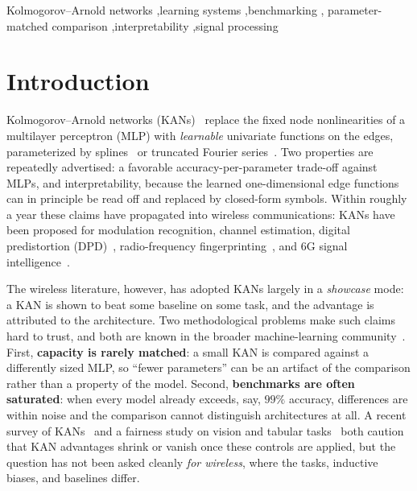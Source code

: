\documentclass[final,5p,times]{elsarticle}
\begin{document}
\begin{frontmatter}
\begin{keyword}
Kolmogorov--Arnold networks \sep learning systems \sep benchmarking \sep
parameter-matched comparison \sep interpretability \sep signal processing
\end{keyword}

\end{frontmatter}

\section{Introduction}\label{sec:intro}
Kolmogorov--Arnold networks (KANs)~\cite{liu2024kan} replace the fixed
node nonlinearities of a multilayer perceptron (MLP) with \emph{learnable} univariate
functions on the edges, parameterized by splines~\cite{liu2024kan} or truncated Fourier
series~\cite{efficientkan}. Two properties are repeatedly advertised: a favorable
accuracy-per-parameter trade-off against MLPs, and interpretability, because the learned
one-dimensional edge functions can in principle be read off and replaced by closed-form
symbols. Within roughly a year these claims have propagated into wireless communications:
KANs have been proposed for modulation recognition, channel estimation, digital
predistortion (DPD)~\cite{kandpd}, radio-frequency fingerprinting~\cite{kanrff},
and 6G signal intelligence~\cite{wsr6g}.

The wireless literature, however, has adopted KANs largely in a \emph{showcase} mode: a
KAN is shown to beat some baseline on some task, and the advantage is attributed to the
architecture. Two methodological problems make such claims hard to trust, and both are
known in the broader machine-learning community~\cite{yu2024fairer}. First,
\textbf{capacity is rarely matched}: a small KAN is compared against a differently sized
MLP, so ``fewer parameters'' can be an artifact of the comparison rather than a property
of the model. Second, \textbf{benchmarks are often saturated}: when every model already
exceeds, say, $99\%$ accuracy, differences are within noise and the comparison cannot
distinguish architectures at all. A recent survey of KANs~\cite{kansurvey2024} and a
fairness study on vision and tabular tasks~\cite{yu2024fairer} both caution that KAN
advantages shrink or vanish once these controls are applied, but the question has not
been asked cleanly \emph{for wireless}, where the tasks, inductive biases, and baselines
differ.
\end{document}
